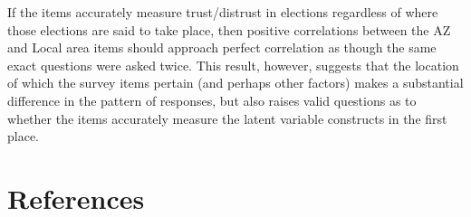 \documentclass[
  12pt,
  letterpaper,
]{article}
\begin{document}
If the items accurately measure trust/distrust in elections regardless
of where those elections are said to take place, then positive
correlations between the AZ and Local area items should approach perfect
correlation as though the same exact questions were asked twice. This
result, however, suggests that the location of which the survey items
pertain (and perhaps other factors) makes a substantial difference in
the pattern of responses, but also raises valid questions as to whether
the items accurately measure the latent variable constructs in the first
place.

\pagebreak

\section*{References}\label{bibliography}
\end{document}
